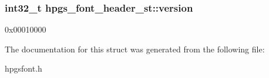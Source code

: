 \subsubsection[{version}]{\setlength{\rightskip}{0pt plus 5cm}int32\_\-t {\bf hpgs\_\-font\_\-header\_\-st::version}}\label{structhpgs__font__header__st_ad3ab0f4f9723b09428d611c04dbf66bf}
0x00010000 

The documentation for this struct was generated from the following file:\begin{DoxyCompactItemize}
\item 
hpgsfont.h\end{DoxyCompactItemize}
